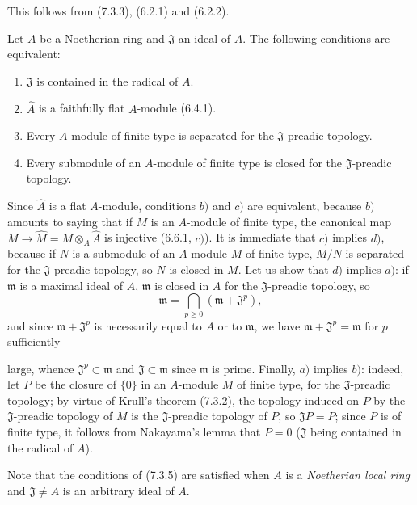 This follows from (7.3.3), (6.2.1) and (6.2.2).

\begin{corollary}[7.3.5]
\label{0.7.3.5}
Let $A$ be a Noetherian ring and $\mathfrak J$ an ideal of $A$. The
following conditions are equivalent:
\begin{enumerate}
  \item[$a)$] $\mathfrak J$ is contained in the radical of $A$.
  \item[$b)$] $\widehat A$ is a faithfully flat $A$-module (6.4.1).
  \item[$c)$] Every $A$-module of finite type is separated for the
  $\mathfrak J$-preadic topology.
  \item[$d)$] Every submodule of an $A$-module of finite type is closed for the
  $\mathfrak J$-preadic topology.
\end{enumerate}
\end{corollary}

Since $\widehat A$ is a flat $A$-module, conditions $b)$ and $c)$ are
equivalent, because $b)$ amounts to saying that if $M$ is an $A$-module of finite
type, the canonical map
$M\to\widehat M=M\otimes_A\widehat A$ is injective (6.6.1, $c)$). It is
immediate that $c)$ implies $d)$, because if $N$ is a submodule of an $A$-module
$M$ of finite type, $M/N$ is separated for the $\mathfrak J$-preadic topology,
so $N$ is closed in $M$. Let us show that $d)$ implies $a)$: if
$\mathfrak m$ is a maximal ideal of $A$, $\mathfrak m$ is closed in $A$
for the $\mathfrak J$-preadic topology, so
\[
  \mathfrak m=\bigcap_{p\geq0}(\mathfrak m+\mathfrak J^p),
\]
and since $\mathfrak m+\mathfrak J^p$ is necessarily equal to $A$ or to
$\mathfrak m$, we have $\mathfrak m+\mathfrak J^p=\mathfrak m$ for $p$ sufficiently


large, whence $\mathfrak J^p\subset\mathfrak m$ and
$\mathfrak J\subset\mathfrak m$ since $\mathfrak m$ is prime. Finally,
$a)$ implies $b)$: indeed, let $P$ be the closure of $\{0\}$ in an
$A$-module $M$ of finite type, for the $\mathfrak J$-preadic topology; by
virtue of Krull's theorem (7.3.2), the topology induced on $P$ by the
$\mathfrak J$-preadic topology of $M$ is the $\mathfrak J$-preadic topology of
$P$, so $\mathfrak JP=P$; since $P$ is of finite type, it follows from Nakayama's
lemma that $P=0$ ($\mathfrak J$ being contained in the radical of $A$).

Note that the conditions of (7.3.5) are satisfied when $A$ is a
\emph{Noetherian local ring} and $\mathfrak J\neq A$ is an arbitrary ideal of
$A$.

